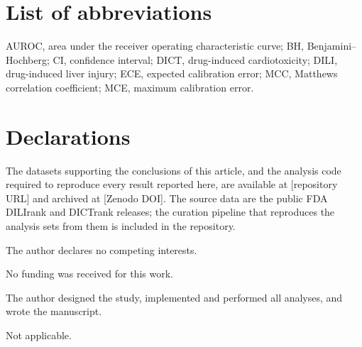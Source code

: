 
\backmatter

\section*{List of abbreviations}

AUROC, area under the receiver operating characteristic curve; BH,
Benjamini--Hochberg; CI, confidence interval; DICT, drug-induced
cardiotoxicity; DILI, drug-induced liver injury; ECE, expected calibration
error; MCC, Matthews correlation coefficient; MCE, maximum calibration error.

\section*{Declarations}


The datasets supporting the conclusions of this article, and the analysis code
required to reproduce every result reported here, are available at
[repository URL] and archived at [Zenodo DOI]. The source data are the public
FDA DILIrank and DICTrank releases; the curation pipeline that reproduces the
analysis sets from them is included in the repository.


The author declares no competing interests.


No funding was received for this work.


The author designed the study, implemented and performed all analyses, and
wrote the manuscript.


Not applicable.

